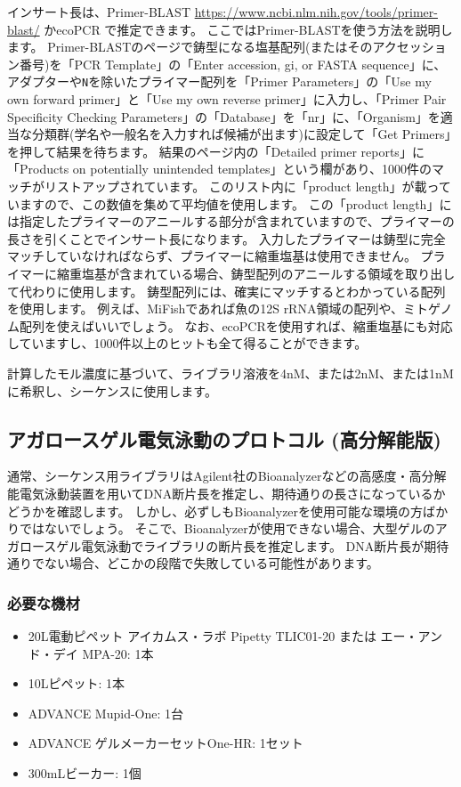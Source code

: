 \documentclass[titlepage,10pt,a4paper,uplatex]{jsbook}
\begin{document}
インサート長は、Primer-BLAST \url{https://www.ncbi.nlm.nih.gov/tools/primer-blast/} かecoPCR \citep{Bellemain2010}で推定できます。
ここではPrimer-BLASTを使う方法を説明します。
Primer-BLASTのページで鋳型になる塩基配列(またはそのアクセッション番号)を「PCR Template」の「Enter accession, gi, or FASTA sequence」に、アダプターや\texttt{N}を除いたプライマー配列を「Primer Parameters」の「Use my own forward primer」と「Use my own reverse primer」に入力し、「Primer Pair Specificity Checking Parameters」の「Database」を「nr」に、「Organism」を適当な分類群(学名や一般名を入力すれば候補が出ます)に設定して「Get Primers」を押して結果を待ちます。
結果のページ内の「Detailed primer reports」に「Products on potentially unintended templates」という欄があり、1000件のマッチがリストアップされています。
このリスト内に「product length」が載っていますので、この数値を集めて平均値を使用します。
この「product length」には指定したプライマーのアニールする部分が含まれていますので、プライマーの長さを引くことでインサート長になります。
入力したプライマーは鋳型に完全マッチしていなければならず、プライマーに縮重塩基は使用できません。
プライマーに縮重塩基が含まれている場合、鋳型配列のアニールする領域を取り出して代わりに使用します。
鋳型配列には、確実にマッチするとわかっている配列を使用します。
例えば、MiFishであれば魚の12S rRNA領域の配列や、ミトゲノム配列を使えばいいでしょう。
なお、ecoPCRを使用すれば、縮重塩基にも対応していますし、1000件以上のヒットも全て得ることができます。

計算したモル濃度に基づいて、ライブラリ溶液を4nM、または2nM、または1nMに希釈し、シーケンスに使用します。

\subsection{アガロースゲル電気泳動のプロトコル (高分解能版)}

通常、シーケンス用ライブラリはAgilent社のBioanalyzerなどの高感度・高分解能電気泳動装置を用いてDNA断片長を推定し、期待通りの長さになっているかどうかを確認します。
しかし、必ずしもBioanalyzerを使用可能な環境の方ばかりではないでしょう。
そこで、Bioanalyzerが使用できない場合、大型ゲルのアガロースゲル電気泳動でライブラリの断片長を推定します。
DNA断片長が期待通りでない場合、どこかの段階で失敗している可能性があります。

\subsubsection{必要な機材}
\begin{itemize}
\item 20{\textmu}L電動ピペット アイカムス・ラボ Pipetty TLIC01-20 または エー・アンド・デイ MPA-20: 1本
\item 10{\textmu}Lピペット: 1本
\item ADVANCE Mupid-One: 1台
\item ADVANCE ゲルメーカーセットOne-HR: 1セット
\item 300mLビーカー: 1個
\end{itemize}
\end{document}
